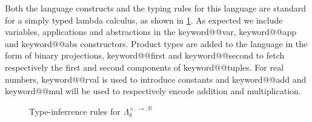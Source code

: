 \documentclass[11pt, final]{article}
\makeatletter
\def\lambdaBase{\Lambda_{\delta}^{\times, \rightarrow, \mathds{R}}}
\def\<#1>{\csname keyword@@#1\endcsname}
\makeatother
\begin{document}
  Both the language constructs and the typing rules for this language are standard for a simply typed lambda calculus, as shown in \ref{fig:base_infer}.
  As expected we include variables, applications and abstractions in the \<var>, \<app> and \<abs> constructors.
  Product types are added to the language in the form of binary projections, \<first> and \<second> to fetch respectively the first and second components of \<tuple>s.
  For real numbers, \<rval> is used to introduce constants and \<add> and \<mul> will be used to respectively encode addition and multiplication.

  \begin{figure}
    \caption{Type-inferrence rules for $\lambdaBase$}
    \label{fig:base_infer}
  \end{figure}
\end{document}
